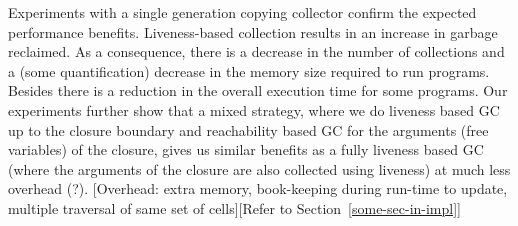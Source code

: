 \documentclass[9pt]{sigplanconf}
\begin{document}
{\color  {Myblue}   Experiments  with  a  single   generation  copying
  collector confirm the expected performance benefits.  Liveness-based
  collection  results  in an  increase  in  garbage reclaimed.   As  a
  consequence, there is a decrease in  the number of collections and a
  (some quantification)  decrease in the  memory size required  to run
  programs. Besides there is a reduction in the overall execution time
  for  some  programs.  Our  experiments  further  show that  a  mixed
  strategy, where we  do liveness based GC up to  the closure boundary
  and reachability based GC for  the arguments (free variables) of the
  closure,  gives us  similar benefits  as a  fully liveness  based GC
  (where  the  arguments  of  the closure  are  also  collected  using
  liveness)  at  much  less  overhead (?).  [Overhead:  extra  memory,
    book-keeping during run-time to update, multiple traversal of same
    set of cells][Refer to Section~\ref{some-sec-in-impl}] }


\end{document}
